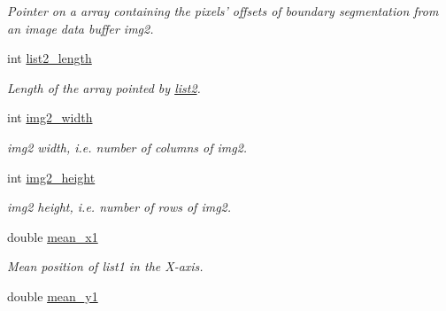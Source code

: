 \begin{DoxyCompactItemize}
\begin{DoxyCompactList}\small\item\em Pointer on a array containing the pixels' offsets of boundary segmentation from an image data buffer {\itshape img2}. \end{DoxyCompactList}\item 
\hypertarget{classofeli_1_1_hausdorff_distance_af722dd3132298fa7113e897129e587b3}{int \hyperlink{classofeli_1_1_hausdorff_distance_af722dd3132298fa7113e897129e587b3}{list2\-\_\-length}}\label{classofeli_1_1_hausdorff_distance_af722dd3132298fa7113e897129e587b3}

\begin{DoxyCompactList}\small\item\em Length of the array pointed by \hyperlink{classofeli_1_1_hausdorff_distance_a214f70f274ec1099b0b3fda1e5060c1f}{list2}. \end{DoxyCompactList}\item 
\hypertarget{classofeli_1_1_hausdorff_distance_a923f35c5cec18e61eae71f1e0a7b139f}{int \hyperlink{classofeli_1_1_hausdorff_distance_a923f35c5cec18e61eae71f1e0a7b139f}{img2\-\_\-width}}\label{classofeli_1_1_hausdorff_distance_a923f35c5cec18e61eae71f1e0a7b139f}

\begin{DoxyCompactList}\small\item\em {\itshape img2} width, i.\-e. number of columns of {\itshape img2}. \end{DoxyCompactList}\item 
\hypertarget{classofeli_1_1_hausdorff_distance_aa5e3dd2eff7f1302e861a294c7a92f44}{int \hyperlink{classofeli_1_1_hausdorff_distance_aa5e3dd2eff7f1302e861a294c7a92f44}{img2\-\_\-height}}\label{classofeli_1_1_hausdorff_distance_aa5e3dd2eff7f1302e861a294c7a92f44}

\begin{DoxyCompactList}\small\item\em img2 height, i.\-e. number of rows of img2. \end{DoxyCompactList}\item 
\hypertarget{classofeli_1_1_hausdorff_distance_a70e3c0b9d2d8ce97529266fbbae92338}{double \hyperlink{classofeli_1_1_hausdorff_distance_a70e3c0b9d2d8ce97529266fbbae92338}{mean\-\_\-x1}}\label{classofeli_1_1_hausdorff_distance_a70e3c0b9d2d8ce97529266fbbae92338}

\begin{DoxyCompactList}\small\item\em Mean position of list1 in the X-\/axis. \end{DoxyCompactList}\item 
\hypertarget{classofeli_1_1_hausdorff_distance_a493c07736724a1cc41124517242f767b}{double \hyperlink{classofeli_1_1_hausdorff_distance_a493c07736724a1cc41124517242f767b}{mean\-\_\-y1}}\label{classofeli_1_1_hausdorff_distance_a493c07736724a1cc41124517242f767b}


\end{DoxyCompactItemize}
